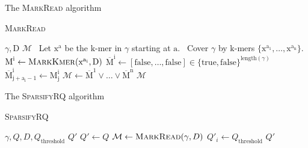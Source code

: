 \documentclass[12pt]{beamer}
\begin{document}
    \begin{frame}{The \textsc{MarkRead} algorithm}
        \begin{algorithm}[H]
	    \caption{\textsc{MarkRead}}
	    \begin{algorithmic}[1]
                \REQUIRE \(\gamma, \text{D}\)
                \ENSURE \(\mathcal{M}\)
		\STATE \, \COMMENT Let \(\text{x}^\text{a}\) be the \(\text{k}\)-mer in \(\gamma\) starting at \(\text{a}\).
                \STATE \, \COMMENT Cover \(\gamma\) by \(\text{k}\)-mers \(\{\text{x}^{\text{a}_\text{1}},\dots,\text{x}^{\text{a}_\text{n}}\}\).
		    \STATE \(\text{M}^\text{i} \leftarrow \text{\textsc{MarkKmer}}(\text{x}^{\text{a}_\text{i}},\text{D})\)
                    \STATE \(\overline{\text{M}}^\text{i} \leftarrow [\text{false},\dots,\text{false}]\in \{\text{true},\text{false}\}^{\text{length}(\gamma)}\)
		        \STATE \(\overline{\text{M}}^{\text{i}}_{\text{j}+\text{a}_\text{i}-1} \leftarrow \text{M}^\text{i}_\text{j}\)
		    \ENDFOR
                \ENDFOR
		\STATE \(\mathcal{M} \leftarrow \overline{\text{M}}^1 \lor \dots \lor \overline{\text{M}}^\text{n}\)
		\RETURN \(\mathcal{M}\)
	    \end{algorithmic}
	\end{algorithm}
    \end{frame}

    \begin{frame}{The \textsc{SparsifyRQ} algorithm}
        \begin{algorithm}[H]
	    \caption{\textsc{SparsifyRQ}}
	    \begin{algorithmic}[1]
		\REQUIRE \(\gamma,Q,D,Q_{\text{threshold}}\)
		\ENSURE \(Q'\)
                \STATE \(Q' \leftarrow Q\)
		\STATE \(\mathcal{M} \leftarrow \text{\textsc{MarkRead}}(\gamma, D)\)
		        \STATE \(Q'_i \leftarrow Q_{\text{threshold}}\)
		    \ENDIF
		\ENDFOR
		\RETURN \(Q'\)
	    \end{algorithmic}
	\end{algorithm}
    \end{frame}
\end{document}
